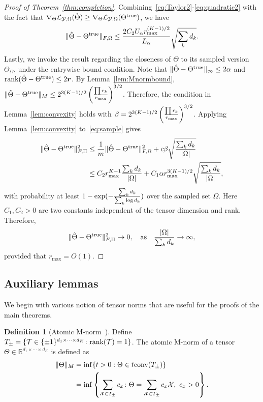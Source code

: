 \documentclass[11pt]{article}
\theoremstyle{plain}
\theoremstyle{definition}
\newtheorem{defn}{Definition}
\providecommand{\DIFaddtex}[1]{{\protect\color{blue}\uwave{#1}}} %
\providecommand{\DIFdeltex}[1]{{\protect\color{red}\sout{#1}}}                      %
\providecommand{\DIFaddbegin}{} %
\providecommand{\DIFaddend}{} %
\providecommand{\DIFdelbegin}{} %
\providecommand{\DIFdelend}{} %
\providecommand{\DIFadd}[1]{\texorpdfstring{\DIFaddtex{#1}}{#1}} %
\providecommand{\DIFdel}[1]{\texorpdfstring{\DIFdeltex{#1}}{}} %
\begin{document}
\begin{proof}[Proof of Theorem~\ref{thm:completion}]
Combining~\eqref{eq:Taylor2}-\eqref{eq:quadratic2} with the fact that \DIFdelbegin \DIFdel{$\nabla_{\Theta}\mathcal{L}_{\mathcal{Y},\Omega}(\hat \Theta)\geq \nabla_{\Theta}\mathcal{L}_{\mathcal{Y},\Omega}(\Theta^{\text{true}})$}\DIFdelend \DIFaddbegin \DIFadd{$\logl(\hat \Theta)\geq \logl(\trueT)$}\DIFaddend , we have
\begin{equation}\label{eq:sample}
\lVert\hat \Theta-\Theta^{\text{true}}\rVert_{F,\Omega}\leq {2C_2U_\alpha  r_{\max}^{(K-1)/2} \over L_\alpha} \sqrt{\sum_kd_k}.
\end{equation}
Lastly, we invoke the result regarding the closeness of $\Theta$ to its sampled version $\Theta_{\Omega}$, under the entrywise bound condition. Note that $\lVert\hat\Theta-\Theta^{\text{true}}\rVert_\infty\leq 2\alpha$ and $\text{rank}(\hat \Theta-\Theta^{\text{true}})\leq 2\bm{r}$. By Lemma~\ref{lem:Mnormbound}, \DIFdelbegin \DIFdel{$\lVert\hat \Theta-\Theta^{\text{true}}\rVert_M\leq 2^{3(K-1)/2} \left({\prod r_k \over r_{\max}}\right)^{3/2}$}\DIFdelend \DIFaddbegin \DIFadd{$\anormSize{}{\hat \Theta-\trueT}\leq 2^{(3K-1)/2} \alpha \left({\prod r_k \over r_{\max}}\right)^{3/2}$}\DIFaddend . Therefore, the condition in Lemma~\ref{lem:convexity} holds with \DIFdelbegin \DIFdel{$\beta=2^{3(K-1)/2} \left({\prod r_k \over r_{\max}}\right)^{3/2}$}\DIFdelend \DIFaddbegin \DIFadd{$\beta=2^{(3K-1)/2}\alpha \left({\prod r_k \over r_{\max}}\right)^{3/2}$}\DIFaddend . Applying Lemma~\ref{lem:convexity} to~\eqref{eq:sample} gives
\begin{align}
 \lVert\hat \Theta-\Theta^{\text{true}}\rVert_{F,\Pi}^2&\leq {1\over m}\lVert\hat \Theta-\Theta^{\text{true}}\rVert_{F,\Omega}^2+c\beta\sqrt{\sum_k d_k\over |\Omega|}\\
 &\leq {C_2  r^{K-1}_{\max}} {\sum_k d_k \over |\Omega|}+C_1 \alpha r_{\max}^{3(K-1)/2}\sqrt{\sum_kd_k\over |\Omega|},
\end{align}
with probability at least $1-\exp(-{\sum_kd_k\over \sum_k \log d_k})$ over the sampled set $\Omega$. Here $C_1, C_2>0$ are two constants independent of the tensor dimension and rank. Therefore,
\[
 \lVert\hat \Theta-\Theta^{\text{true}}\rVert_{F,\Pi}^2\to 0,\quad \text{as}\quad {|\Omega|\over \sum_kd_k}\to \infty,
\]
provided that $r_{\max}=O(1)$.
\end{proof}

\subsection{Auxiliary lemmas}
\label{sec:lemma}


We begin with various notion of tensor norms that are useful for the proofs of the main theorems.

\begin{defn}[Atomic M-norm~\citep{ghadermarzy2019near}]
Define $T_{\pm}=\{\mathcal{T}\in\{\pm 1 \}^{d_1\times \cdots \times d_K}\colon \text{rank}(\mathcal{T})=1\}$. The atomic M-norm of a tensor $\Theta\in\mathbb{R}^{d_1\times \cdots \times d_K}$ is defined as
\begin{align}
\lVert\Theta\rVert_M&=\inf\{t>0: \Theta\in t\text{conv}(T_{\pm})\}\\
&=\inf\left\{\sum_{\mathcal{X}\in T_{\pm}}c_x\colon \Theta=\sum_{\mathcal{X}\in T_{\pm}} c_x\mathcal{X}, \ c_x>0\right\}.
\end{align}
\end{defn}
\end{document}
